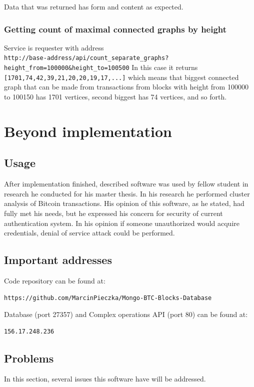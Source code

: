 \documentclass[12pt, en, eng, oneside, final]{mgr}
\begin{document}
Data that was returned has form and content as expected. 

\subsection{Getting count of maximal connected graphs by height}
Service is requester with address
\\ \verb|http://base-address/api/count_separate_graphs?height_from=100000&height_to=100500|
In this case it returns \texttt{[1701,74,42,39,21,20,20,19,17,...]} which means that biggest connected graph that can be made from transactions from blocks with height from 100000 to 100150 has 1701 vertices, second biggest has 74 vertices, and so forth.


\chapter{Beyond implementation}

\section{Usage}
After implementation finished, described software was used by fellow student in research he conducted for his master thesis\cite{twardak}. In his research he performed cluster analysis of Bitcoin transactions. His opinion of this software, as he stated, had fully met his needs, but he expressed his concern for security of current authentication system. In his opinion if someone unauthorized would acquire credentials, denial of service attack could be performed.

\section{Important addresses}
Code repository can be found at:
\begin{verbatim}
https://github.com/MarcinPieczka/Mongo-BTC-Blocks-Database
\end{verbatim}
\noindent
Database (port 27357) and Complex operations API (port 80) can be found at:
\begin{verbatim}
156.17.248.236
\end{verbatim}

\section{Problems}
In this section, several issues this software have will be addressed.
\end{document}

